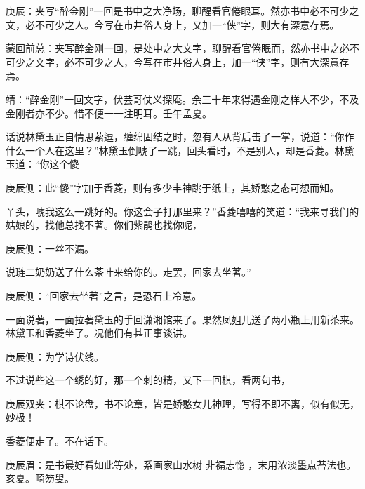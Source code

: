

\begin{parag}
    \begin{note}庚辰：夹写“醉金刚”一回是书中之大净场，聊醒看官倦眼耳。然亦书中必不可少之文，必不可少之人。今写在市井俗人身上，又加一“侠”字，则大有深意存焉。\end{note}
\end{parag}


\begin{parag}
    \begin{note}蒙回前总：夹写醉金刚一回，是处中之大文字，聊醒看官倦眠而，然亦书中之必不可少之文字，必不可少之人，今写在市井俗人身上，加一“侠”字，则有大深意存焉。\end{note}
\end{parag}


\begin{parag}
    \begin{note}靖：“醉金刚”一回文字，伏芸哥仗义探庵。余三十年来得遇金刚之样人不少，不及金刚者亦不少。惜不便一一注明耳。壬午孟夏。\end{note}
\end{parag}


\begin{parag}
    话说林黛玉正自情思萦逗，缠绵固结之时，忽有人从背后击了一掌，说道：“你作什么一个人在这里？”林黛玉倒唬了一跳，回头看时，不是别人，却是香菱。林黛玉道：“你这个傻\begin{note}庚辰侧：此“傻”字加于香菱，则有多少丰神跳于纸上，其娇憨之态可想而知。\end{note}丫头，唬我这么一跳好的。你这会子打那里来？”香菱嘻嘻的笑道：“我来寻我们的姑娘的，找他总找不著。你们紫鹃也找你呢，\begin{note}庚辰侧：一丝不漏。\end{note}说琏二奶奶送了什么茶叶来给你的。走罢，回家去坐著。”\begin{note}庚辰侧：“回家去坐著”之言，是恐石上冷意。\end{note}一面说著，一面拉著黛玉的手回潇湘馆来了。果然凤姐儿送了两小瓶上用新茶来。林黛玉和香菱坐了。况他们有甚正事谈讲。\begin{note}庚辰侧：为学诗伏线。\end{note}不过说些这一个绣的好，那一个刺的精，又下一回棋，看两句书，\begin{note}庚辰双夹：棋不论盘，书不论章，皆是娇憨女儿神理，写得不即不离，似有似无，妙极！\end{note}香菱便走了。不在话下。\begin{note}庚辰眉：是书最好看如此等处，系画家山水树 非褊志惚 ，末用浓淡墨点苔法也。亥夏。畸笏叟。\end{note}
\end{parag}


